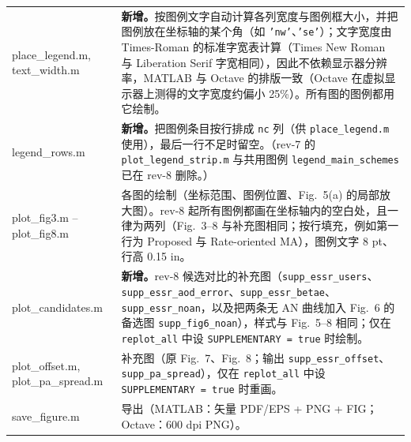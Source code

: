 \documentclass[11pt,a4paper]{ctexart}
\newcommand{\code}[1]{\texttt{#1}}
\begin{document}
\begin{longtable}{>{\ttfamily\small}p{4.6cm}p{11.2cm}}
place\_legend.m, text\_width.m & \textbf{新增。}按图例文字自动计算各列宽度与图例框大小，并把图例放在坐标轴的某个角（如 \code{'nw'}、\code{'se'}）；文字宽度由 Times-Roman 的标准字宽表计算（Times New Roman 与 Liberation Serif 字宽相同），因此不依赖显示器分辨率，MATLAB 与 Octave 的排版一致（Octave 在虚拟显示器上测得的文字宽度约偏小 25\%）。所有图的图例都用它绘制。\\
legend\_rows.m & \textbf{新增。}把图例条目按行排成 \code{nc} 列（供 \code{place\_legend.m} 使用），最后一行不足时留空。（rev-7 的 \code{plot\_legend\_strip.m} 与共用图例 \code{legend\_main\_schemes} 已在 rev-8 删除。）\\
plot\_fig3.m -- plot\_fig8.m & 各图的绘制（坐标范围、图例位置、Fig.~5(a) 的局部放大图）。rev-8 起所有图例都画在坐标轴内的空白处，且一律为两列（Fig.~3--8 与补充图相同；按行填充，例如第一行为 Proposed 与 Rate-oriented MA），图例文字 8 pt、行高 0.15 in。\\
plot\_candidates.m & \textbf{新增。}rev-8 候选对比的补充图（\code{supp\_essr\_users}、\code{supp\_essr\_aod\_error}、\code{supp\_essr\_betae}、\code{supp\_essr\_noan}，以及把两条无 AN 曲线加入 Fig.~6 的备选图 \code{supp\_fig6\_noan}），样式与 Fig.~5--8 相同；仅在 \code{replot\_all} 中设 \code{SUPPLEMENTARY = true} 时绘制。\\
plot\_offset.m, plot\_pa\_spread.m & 补充图（原 Fig.~7、Fig.~8；输出 \code{supp\_essr\_offset}、\code{supp\_pa\_spread}），仅在 \code{replot\_all} 中设 \code{SUPPLEMENTARY = true} 时重画。\\
save\_figure.m & 导出（MATLAB：矢量 PDF/EPS + PNG + FIG；Octave：600 dpi PNG）。\\
\bottomrule
\end{longtable}

\end{document}

